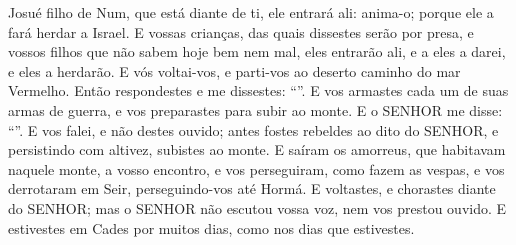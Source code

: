 {{{{  Josué filho de Num, que está diante de ti, ele entrará ali: anima-o; porque ele a fará herdar a Israel.
  E vossas crianças, das quais dissestes serão por presa, e vossos filhos que não sabem hoje bem nem mal, eles entrarão ali, e a eles a darei, e eles a herdarão.
  E vós voltai-vos, e parti-vos ao deserto caminho do mar Vermelho}}.
  Então respondestes e me dissestes: \enquote{}. E vos armastes cada um de suas armas de guerra, e vos preparastes para subir ao monte.
  E o SENHOR me disse: \enquote{}.
  E vos falei, e não destes ouvido; antes fostes rebeldes ao dito do SENHOR, e persistindo com altivez, subistes ao monte.
  E saíram os amorreus, que habitavam naquele monte, a vosso encontro, e vos perseguiram, como fazem as vespas, e vos derrotaram em Seir, perseguindo-vos até Hormá.
  E voltastes, e chorastes diante do SENHOR; mas o SENHOR não escutou vossa voz, nem vos prestou ouvido.
  E estivestes em Cades por muitos dias, como nos dias que estivestes}.
\par }

